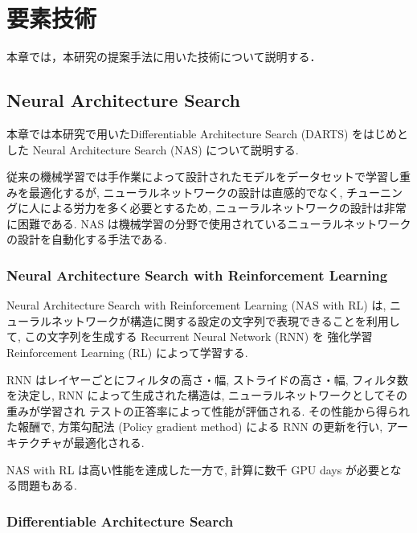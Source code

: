 \newpage
\changeindent{0cm}
\section{要素技術}
\label{sec:tech}
\changeindent{2cm}

本章では，本研究の提案手法に用いた技術について説明する．

\changeindent{0cm}
\subsection{Neural Architecture Search}
\changeindent{2cm}
\label{sec:02_deep}
本章では本研究で用いたDifferentiable Architecture Search (DARTS) をはじめとした
Neural Architecture Search (NAS) について説明する.

従来の機械学習では手作業によって設計されたモデルをデータセットで学習し重みを最適化するが,
ニューラルネットワークの設計は直感的でなく,
チューニングに人による労力を多く必要とするため,
ニューラルネットワークの設計は非常に困難である.
NAS は機械学習の分野で使用されているニューラルネットワークの設計を自動化する手法である.


\changeindent{0cm}
\subsubsection{Neural Architecture Search with Reinforcement Learning}
\changeindent{2cm}
\label{sec:02_nas}
Neural Architecture Search with Reinforcement Learning (NAS with RL)\cite{DBLP:journals/corr/ZophL16} は,
ニューラルネットワークが構造に関する設定の文字列で表現できることを利用して,
この文字列を生成する Recurrent Neural Network (RNN)\cite{mikolov2010recurrent} を
強化学習 Reinforcement Learning (RL)\cite{sutton2018reinforcement} によって学習する.

RNN はレイヤーごとにフィルタの高さ・幅, ストライドの高さ・幅, フィルタ数を決定し,
RNN によって生成された構造は, ニューラルネットワークとしてその重みが学習され
テストの正答率によって性能が評価される.
その性能から得られた報酬で, 方策勾配法 (Policy gradient method)\cite{sutton1999policy} による RNN の更新を行い,
アーキテクチャが最適化される.

NAS with RL は高い性能を達成した一方で, 計算に数千 GPU days が必要となる問題もある.

\changeindent{0cm}
\subsubsection{Differentiable Architecture Search}
\changeindent{2cm}
\label{sec:02_darts}

